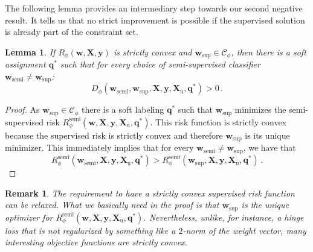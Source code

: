 \documentclass[twoside]{memoir}\usepackage[]{graphicx}\usepackage{xcolor}
\newtheorem{lemma}{Lemma}
\newtheorem{remark}{Remark}
\begin{document}
The following lemma provides an intermediary step towards our second negative result.  It tells us that no strict improvement is possible if the supervised solution is already part of the constraint set.
\begin{lemma} \label{lemma:limitconstrainedspace}
If ${R}_\phi(\mathbf{w},\mathbf{X},\mathbf{y})$ is strictly convex and $\mathbf{w}_\mathrm{sup} \in \mathcal{C}_\phi$, then there is a soft assignment $\mathbf{q}^\ast$ such that for every choice of semi-supervised classifier $\mathbf{w}_\mathrm{semi} \neq \mathbf{w}_\mathrm{sup}$:  $${D}_\phi(\mathbf{w}_\mathrm{semi},\mathbf{w}_\mathrm{sup},\mathbf{X},\mathbf{y},\mathbf{X}_\mathrm{u},\mathbf{q}^\ast) > 0\,.$$
\end{lemma}
\begin{proof}
As $\mathbf{w}_\mathrm{sup} \in \mathcal{C}_\phi$ there is a soft labeling $\mathbf{q}^\ast$ such that $\mathbf{w}_\mathrm{sup}$ minimizes the semi-supervised risk ${R}^\mathrm{semi}_\phi(\mathbf{w},\mathbf{X},\mathbf{y},\mathbf{X}_\mathrm{u},\mathbf{q}^\ast)$.  This risk function is strictly convex because the supervised risk is strictly convex and therefore $\mathbf{w}_\mathrm{sup}$ is its unique minimizer.  This immediately implies that for every $\mathbf{w}_\mathrm{semi} \neq \mathbf{w}_\mathrm{sup}$, we have that $${R}^\mathrm{semi}_\phi(\mathbf{w}_\mathrm{semi},\mathbf{X},\mathbf{y},\mathbf{X}_\mathrm{u},\mathbf{q}^\ast) > {R}^\mathrm{semi}_\phi(\mathbf{w}_\mathrm{sup},\mathbf{X},\mathbf{y},\mathbf{X}_\mathrm{u},\mathbf{q}^\ast)\,.$$
\end{proof}
\begin{remark}
The requirement to have a strictly convex supervised risk function can be relaxed.  What we basically need in the proof is that $\mathbf{w}_\mathrm{sup}$ is the unique optimizer for ${R}^\mathrm{semi}_\phi(\mathbf{w},\mathbf{X},\mathbf{y},\mathbf{X}_\mathrm{u},\mathbf{q}^\ast)$.  Nevertheless, unlike, for instance, a hinge loss that is not regularized by something like a $2$-norm of the weight vector, many interesting objective functions are strictly convex.
\end{remark}
\end{document}
